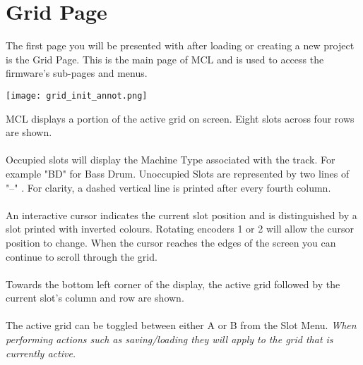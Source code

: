
\chapter{Grid Page}
The first page you will be presented with after loading or creating a new project is the Grid Page. This is the main page of MCL and is used to access the firmware's sub-pages and menus.

\begin{center}
	\texttt{[image: grid\_init\_annot.png]}
\end{center}
MCL displays a portion of the active grid on screen. 
Eight slots across four rows are shown.\\
\\
Occupied slots will display the Machine Type associated with the track. For example "BD" for Bass Drum. Unoccupied Slots are represented by two lines of "--" . For clarity, a dashed vertical line is printed after every fourth column.\\\\
An interactive cursor indicates the current slot position and is distinguished by a slot printed with inverted colours. Rotating encoders 1 or 2 will allow the cursor position to change. When the cursor reaches the edges of the screen you can continue to scroll through the grid.
\\\\
Towards the bottom left corner of the display, the active grid followed by the current slot's column and row are shown.\\\\
The active grid can be toggled between either A or B from the Slot Menu.
\textit{When performing actions such as saving/loading they will apply to the grid that is currently active.}
\\
